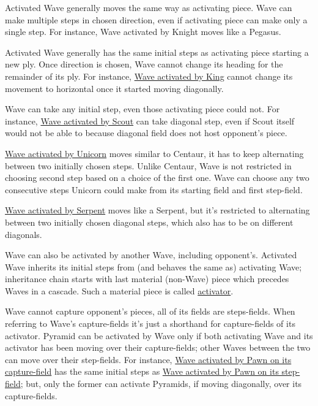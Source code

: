 
Activated Wave generally moves the same way as activating piece. Wave can make
multiple steps in chosen direction, even if activating piece can make only a
single step. For instance, Wave activated by Knight moves like a Pegasus.

Activated Wave generally has the same initial steps as activating piece starting
a new ply. Once direction is chosen, Wave cannot change its heading for the
remainder of its ply. For instance,
\hyperref[fig:scn_mv_024_wave_activated_by_king]{Wave activated by King} cannot
change its movement to horizontal once it started moving diagonally.

Wave can take any initial step, even those activating piece could not. For instance,
\hyperref[fig:scn_hd_27_scout_activating_wave_step_fields_end]{Wave activated by Scout}
can take diagonal step, even if Scout itself would not be able to because diagonal
field does not host opponent's piece.

\hyperref[fig:scn_mv_031_wave_activation_by_unicorn_first_step]{Wave activated by Unicorn}
moves similar to Centaur, it has to keep alternating between two initially chosen
steps. Unlike Centaur, Wave is not restricted in choosing second step based on a
choice of the first one. Wave can choose any two consecutive steps Unicorn could
make from its starting field and first step-field.

\hyperref[fig:scn_tr_40_serpent_activating_wave]{Wave activated by Serpent} moves
like a Serpent, but it's restricted to alternating between two initially chosen
diagonal steps, which also has to be on different diagonals.

Wave can also be activated by another Wave, including opponent's. Activated Wave
inherits its initial steps from (and behaves the same as) activating Wave;
inheritance chain starts with last material (non-Wave) piece which precedes Waves
in a cascade. Such a material piece is called
\hyperref[sec:Terms/Activator]{activator}.

Wave cannot capture opponent's pieces, all of its fields are steps-fields. When
referring to Wave's capture-fields it's just a shorthand for capture-fields of its
activator. Pyramid can be activated by Wave only if both activating Wave and its
activator has been moving over their capture-fields; other Waves between the two
can move over their step-fields.\newline
\indent
For instance,
\hyperref[fig:scn_mv_028_wave_activated_by_capture_pawn]{Wave activated by Pawn on its capture-field}
has the same initial steps as
\hyperref[fig:scn_mv_026_wave_activated_by_step_pawn]{Wave activated by Pawn on its step-field};
but, only the former can activate Pyramids, if moving diagonally, over its
capture-fields.

